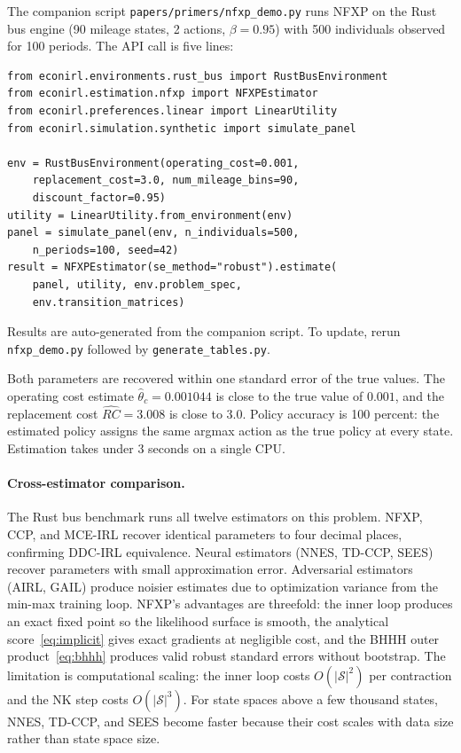 \documentclass[11pt]{article}
\begin{document}
The companion script \texttt{papers/primers/nfxp\_demo.py} runs NFXP on the Rust bus engine (90 mileage states, 2 actions, $\beta = 0.95$) with 500 individuals observed for 100 periods.
The API call is five lines:

\begin{lstlisting}[basicstyle=\footnotesize\ttfamily]
from econirl.environments.rust_bus import RustBusEnvironment
from econirl.estimation.nfxp import NFXPEstimator
from econirl.preferences.linear import LinearUtility
from econirl.simulation.synthetic import simulate_panel

env = RustBusEnvironment(operating_cost=0.001,
    replacement_cost=3.0, num_mileage_bins=90,
    discount_factor=0.95)
utility = LinearUtility.from_environment(env)
panel = simulate_panel(env, n_individuals=500,
    n_periods=100, seed=42)
result = NFXPEstimator(se_method="robust").estimate(
    panel, utility, env.problem_spec,
    env.transition_matrices)
\end{lstlisting}

Results are auto-generated from the companion script.
To update, rerun \texttt{nfxp\_demo.py} followed by
\texttt{generate\_tables.py}.

\begin{table}[H]
\centering
\caption{NFXP-NK on the Rust bus engine (90 states, $\beta = 0.95$, 50{,}000 obs).}
\label{tab:nfxp_results}

\end{table}

Both parameters are recovered within one standard error of the true values.
The operating cost estimate $\hat\theta_c = 0.001044$ is close to the true value of $0.001$, and the replacement cost $\widehat{RC} = 3.008$ is close to $3.0$.
Policy accuracy is 100 percent: the estimated policy assigns the same argmax action as the true policy at every state.
Estimation takes under 3 seconds on a single CPU.

\paragraph{Cross-estimator comparison.}
The Rust bus benchmark runs all twelve estimators on this problem.
NFXP, CCP, and MCE-IRL recover identical parameters to four decimal places, confirming DDC-IRL equivalence.
Neural estimators (NNES, TD-CCP, SEES) recover parameters with small approximation error.
Adversarial estimators (AIRL, GAIL) produce noisier estimates due to optimization variance from the min-max training loop.
NFXP's advantages are threefold: the inner loop produces an exact fixed point so the likelihood surface is smooth, the analytical score~\eqref{eq:implicit} gives exact gradients at negligible cost, and the BHHH outer product~\eqref{eq:bhhh} produces valid robust standard errors without bootstrap.
The limitation is computational scaling: the inner loop costs $O(|\mathcal{S}|^2)$ per contraction and the NK step costs $O(|\mathcal{S}|^3)$.
For state spaces above a few thousand states, NNES, TD-CCP, and SEES become faster because their cost scales with data size rather than state space size.
\end{document}
